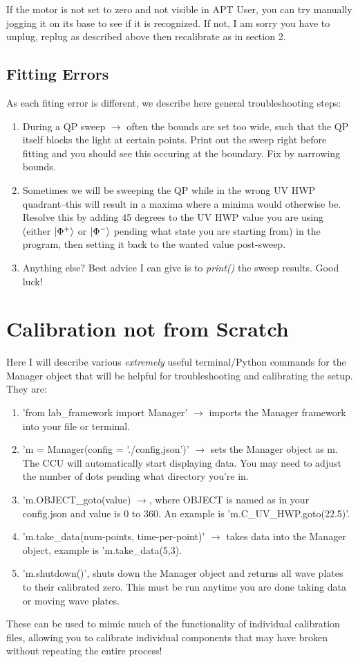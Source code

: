 \documentclass{paper}[11pt]
\begin{document}
If the motor is not set to zero and not visible in APT User, you can try manually jogging it on its base to see if it is recognized. If not, I am sorry you have to unplug, replug as described above then recalibrate as in section 2.
\subsection{Fitting Errors}
As each fiting error is different, we describe here general troubleshooting steps:
\begin{enumerate}
    \item During a QP sweep $\rightarrow$ often the bounds are set too wide, such that the QP itself blocks the light at certain points. Print out the sweep right before fitting and you should see this occuring at the boundary. Fix by narrowing bounds.
    \item Sometimes we will be sweeping the QP while in the wrong UV HWP quadrant--this will result in a maxima where a minima would otherwise be. Resolve this by adding 45 degrees to the UV HWP value you are using (either $\ket{\Phi^+}$ or $\ket{\Phi^-}$ pending what state you are starting from) in the program, then setting it back to the wanted value post-sweep.
    \item Anything else? Best advice I can give is to \textit{print()} the sweep results. Good luck!
\end{enumerate}
\section{Calibration not from Scratch}\label{sec:calib_not_from_scratch}
Here I will describe various \textit{extremely} useful terminal/Python commands for the Manager object that will be helpful for troubleshooting and calibrating the setup. They are:
\begin{enumerate}
    \item 'from lab\_framework import Manager' $\rightarrow$ imports the Manager framework into your file or terminal.
    \item 'm = Manager(config = './config.json')' $\rightarrow$ sets the Manager object as m. The CCU will automatically start displaying data. You may need to adjust the number of dots pending what directory you're in.  
    \item 'm.OBJECT\_goto(value) $\rightarrow$, where OBJECT is named as in your config.json and value is 0 to 360. An example is 'm.C\_UV\_HWP.goto(22.5)'.
    \item 'm.take\_data(num-points, time-per-point)' $\rightarrow$ takes data into the Manager object, example is 'm.take\_data(5,3).
    \item 'm.shutdown()', shuts down the Manager object and returns all wave plates to their calibrated zero. This must be run anytime you are done taking data or moving wave plates. 
\end{enumerate}
These can be used to mimic much of the functionality of individual calibration files, allowing you to calibrate individual components that may have broken without repeating the entire process! 
\end{document}
